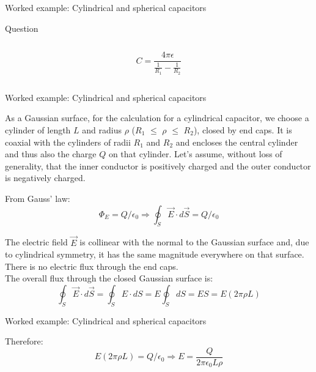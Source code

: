 {\begin{frame}{Worked example: Cylindrical and spherical capacitors}
\begin{blockexmplque}{Question}
\begin{columns}
\begin{column}{0.40\textwidth}
\begin{center}
       \begin{equation*}
           C = \frac{4 \pi \epsilon}{\frac{1}{R_1}-\frac{1}{R_2}}
       \end{equation*}
     \end{center}
    \end{column}
  \end{columns}
  \end{blockexmplque}

\end{frame}

%
%
%

\begin{frame}{Worked example: Cylindrical and spherical capacitors}


  As a Gaussian surface, for the calculation for a cylindrical capacitor,
  we choose a cylinder of length $L$
  and radius $\rho$ ($R_1$ $\le$ $\rho$ $\le$ $R_2$), closed by end caps.
  It is coaxial with the cylinders of radii $R_1$ and $R_2$ and
  encloses the central cylinder and
  thus also the charge $Q$ on that cylinder.
  Let's assume, without loss of generality, that the inner conductor is
  positively charged and the outer conductor is negatively charged.

  From Gauss' law:
  \begin{equation*}
    \Phi_E = Q/\epsilon_0 \Rightarrow
    \oint_{S} \vec{E} \cdot d\vec{S} = Q/\epsilon_0
  \end{equation*}

  The electric field $\vec{E}$
  is collinear with the normal to the Gaussian surface and, due to
  cylindrical symmetry, it has the same magnitude everywhere on that
  surface. There is no electric flux through the end caps.\\
  The overall flux through the closed Gaussian surface is:
  \begin{equation*}
    \oint_{S} \vec{E} \cdot d\vec{S} =
    \oint_{S} E \cdot dS =
    E \oint_{S} dS =
    E S = E (2\pi \rho L)
  \end{equation*}

\end{frame}

%
%
%

\begin{frame}{Worked example: Cylindrical and spherical capacitors}

  Therefore:
  \begin{equation*}
    E (2\pi \rho L) = Q/\epsilon_0 \Rightarrow
    E = \frac{Q}{2\pi \epsilon_0 L \rho}
  \end{equation*}


\end{frame}}
